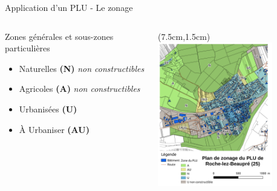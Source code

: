 \documentclass[xcolor=table]{beamer}
\begin{document}
\begin{frame}{Application d'un PLU - Le zonage}
\begin{columns}[T]
\begin{column}[T]{7cm}
Zones générales et sous-zones particulières
\begin{itemize}
\item \alert{Naturelles} \textbf{(N)} \emph{non constructibles}
\item \alert{Agricoles} \textbf{(A)} \emph{non constructibles}
\item \alert{Urbanisées} \textbf{(U)}
\item \alert{À Urbaniser} \textbf{(AU)}
\end{itemize}
\end{column}
\begin{column}[T]{4cm}
\begin{textblock*}{6cm}(7.5cm,1.5cm)
\includegraphics[width=5cm]{cartes/plu-roche.png}
\end{textblock*}	
\end{column}
\end{columns}

\end{frame}
\end{document}
